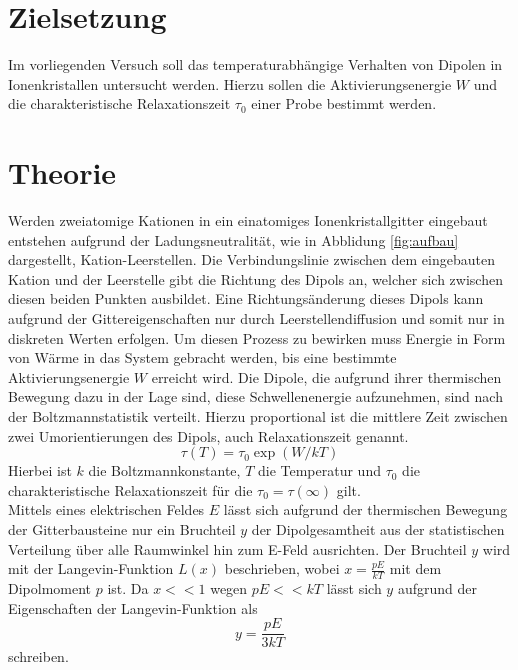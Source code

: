 ﻿\section{Zielsetzung}
Im vorliegenden Versuch soll das temperaturabhängige Verhalten von Dipolen in Ionenkristallen untersucht werden.
Hierzu sollen die Aktivierungsenergie $W$ und die charakteristische Relaxationszeit $\tau_{0}$ einer Probe bestimmt werden.

\section{Theorie}
Werden zweiatomige Kationen in ein einatomiges Ionenkristallgitter
eingebaut entstehen aufgrund der Ladungsneutralität, wie in Abblidung \ref{fig:aufbau} dargestellt, Kation-Leerstellen.
Die Verbindungslinie zwischen dem eingebauten Kation und der Leerstelle gibt
die Richtung des Dipols an, welcher sich zwischen diesen beiden
Punkten ausbildet.
Eine Richtungsänderung dieses Dipols kann aufgrund der Gittereigenschaften
nur durch Leerstellendiffusion und somit nur in diskreten Werten erfolgen.
Um diesen Prozess zu bewirken muss Energie in Form von Wärme in das System gebracht werden, bis
eine bestimmte Aktivierungsenergie $W$ erreicht wird.
Die Dipole, die aufgrund ihrer thermischen Bewegung dazu in der Lage sind,
diese Schwellenenergie aufzunehmen, sind nach der Boltzmannstatistik verteilt.
Hierzu proportional ist die mittlere Zeit zwischen zwei Umorientierungen des Dipols, auch Relaxationszeit genannt.
\begin{equation}
\tau (T)=\tau_{0}\exp(W/kT)
\label{eqn:rel}
\end{equation}
 Hierbei ist $k$ die Boltzmannkonstante, $T$ die Temperatur und $\tau_{0}$ die
 charakteristische Relaxationszeit für die $\tau_{0}=\tau(\infty)$ gilt.\\
 Mittels eines elektrischen Feldes $E$ lässt sich aufgrund der thermischen
 Bewegung der Gitterbausteine nur ein Bruchteil $y$ der Dipolgesamtheit aus der statistischen Verteilung
 über alle Raumwinkel hin zum E-Feld ausrichten. Der Bruchteil $y$ wird mit der
 Langevin-Funktion $L(x)$ beschrieben, wobei $x=\frac{pE}{kT}$ mit dem Dipolmoment $p$ ist.
 Da $x<\!<1$ wegen $pE<\!<kT$ lässt sich $y$ aufgrund der Eigenschaften der Langevin-Funktion als
 \begin{equation}
 y=\frac{pE}{3kT}
 \end{equation}
 schreiben.
